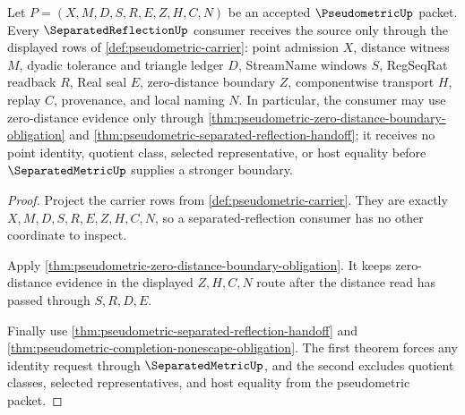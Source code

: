 \begin{theorem}
\label{thm:pseudometric-separated-reflection-source}
Let $P=(X,M,D,S,R,E,Z,H,C,N)$ be an accepted $\PseudometricUp$ packet. Every $\SeparatedReflectionUp$ consumer receives the source only through the displayed rows of \autoref{def:pseudometric-carrier}: point admission $X$, distance witness $M$, dyadic tolerance and triangle ledger $D$, StreamName windows $S$, RegSeqRat readback $R$, Real seal $E$, zero-distance boundary $Z$, componentwise transport $H$, replay $C$, provenance, and local naming $N$. In particular, the consumer may use zero-distance evidence only through \autoref{thm:pseudometric-zero-distance-boundary-obligation} and \autoref{thm:pseudometric-separated-reflection-handoff}; it receives no point identity, quotient class, selected representative, or host equality before $\SeparatedMetricUp$ supplies a stronger boundary.
\end{theorem}
\begin{proof}
Project the carrier rows from \autoref{def:pseudometric-carrier}. They are exactly $X,M,D,S,R,E,Z,H,C,N$, so a separated-reflection consumer has no other coordinate to inspect.

Apply \autoref{thm:pseudometric-zero-distance-boundary-obligation}. It keeps zero-distance evidence in the displayed $Z,H,C,N$ route after the distance read has passed through $S,R,D,E$.

Finally use \autoref{thm:pseudometric-separated-reflection-handoff} and \autoref{thm:pseudometric-completion-nonescape-obligation}. The first theorem forces any identity request through $\SeparatedMetricUp$, and the second excludes quotient classes, selected representatives, and host equality from the pseudometric packet.
\end{proof}

